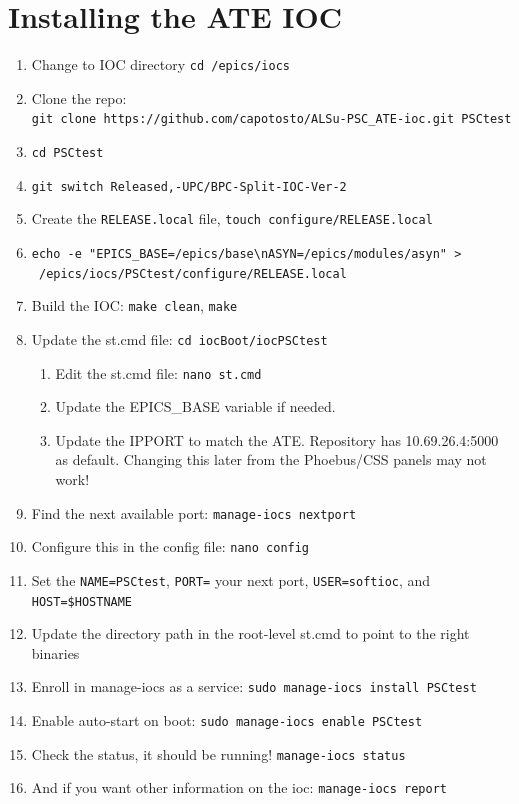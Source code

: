 \section{Installing the ATE IOC}
	\begin{enumerate}
		\item Change to IOC directory \texttt{cd /epics/iocs}
		\item Clone the repo:\\
		\hspace*{1em} \texttt{git clone https://github.com/capotosto/ALSu-PSC\_ATE-ioc.git PSCtest}
		\item \texttt{cd PSCtest}
		\item \texttt{git switch Released,-UPC/BPC-Split-IOC-Ver-2}
		\item Create the \texttt{RELEASE.local} file, \texttt{touch configure/RELEASE.local}
		\item \texttt{echo -e "EPICS\_BASE=/epics/base\textbackslash nASYN=/epics/modules/asyn" >}\\
			\hspace*{2em} \texttt{ /epics/iocs/PSCtest/configure/RELEASE.local}
		\item Build the IOC: \texttt{make clean}, \texttt{make}
		\item Update the st.cmd file: \texttt{cd iocBoot/iocPSCtest}
			\begin{enumerate}
			\item Edit the st.cmd file: \texttt{nano st.cmd}
			\item Update the EPICS\_BASE variable if needed.
			\item Update the IPPORT to match the ATE. Repository has 10.69.26.4:5000 as default. Changing this later from the Phoebus/CSS panels may not work!
		\end{enumerate}

		\item Find the next available port: \texttt{manage-iocs nextport}
		\item Configure this in the config file: \texttt{nano config}
		\item Set the \texttt{NAME=PSCtest}, \texttt{PORT=} your next port, \texttt{USER=softioc}, and \texttt{HOST=\$HOSTNAME}
		\item Update the directory path in the root-level st.cmd to point to the right binaries
		\item Enroll in manage-iocs as a service: \texttt{sudo manage-iocs install PSCtest}
		\item Enable auto-start on boot: \texttt{sudo manage-iocs enable PSCtest}
		\item Check the status, it should be running! \texttt{manage-iocs status}
		\item And if you want other information on the ioc: \texttt{manage-iocs report}
	\end{enumerate}

